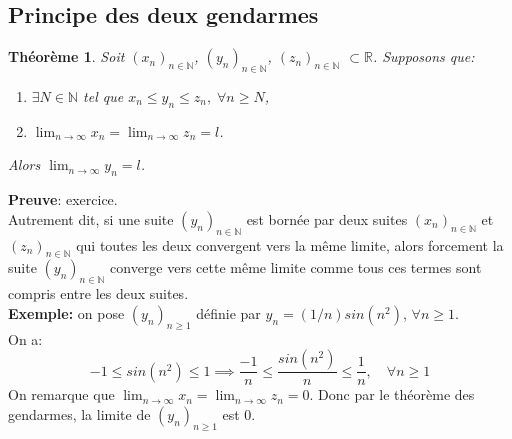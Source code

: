 \documentclass[a4paper, 12pt, french, twoside]{article}
\newtheorem{theorem}{Théorème}[section]
\newcommand{\Nn}{{\mathbb{N}}}
\newcommand{\Rr}{{\mathbb{R}}}
\begin{document}
\subsection{Principe des deux gendarmes}
\begin{theorem}
    Soit $(x_n)_{n\in\Nn}$, $(y_n)_{n\in\Nn}$, $(z_n)_{n\in\Nn}$ $\subset \Rr$. Supposons que:
\begin{enumerate}
    \item $\exists N \in \Nn$ tel que $x_n\leq y_n\leq z_n, \; \forall n\geq N$,
    \item $\lim_{n\rightarrow\infty}x_n=\lim_{n\rightarrow\infty}z_n=l$.
\end{enumerate}
Alors $\lim_{n\rightarrow\infty}y_n=l$.

\end{theorem}

\textbf{Preuve}: exercice.\\



Autrement dit, si une suite $(y_n)_{n\in\Nn}$ est bornée par deux suites $(x_n)_{n\in\Nn}$ et $(z_n)_{n\in\Nn}$ qui toutes les deux convergent vers la même limite, alors forcement la suite $(y_n)_{n\in\Nn}$ converge vers cette même limite comme tous ces termes sont compris entre les deux suites.\\

\textbf{Exemple:} on pose $(y_n)_{n\geq1}$ définie par $y_n=(1/n)sin(n^2)$, $\forall n \geq1$. 
\\On a:
\begin{equation*}
    -1\leq sin(n^2)\leq1 \implies \frac{-1}{n} \leq \frac{sin(n^2)}{n}\leq \frac{1}{n} , \quad \forall n \geq1
\end{equation*}
On remarque que $\lim_{n\rightarrow\infty}x_n=\lim_{n\rightarrow\infty}z_n=0$.
Donc par le théorème des gendarmes, la limite de $(y_n)_{n\geq1}$ est 0. \\
\end{document}
